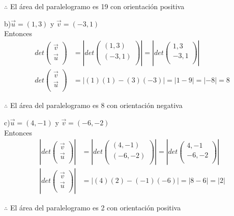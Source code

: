 \documentclass[letterpaper]{article}
\renewcommand{\*}{\cdot}
\theoremstyle{definition}
\begin{document}
	\begin{center}
		$ \therefore $ El área del paralelogramo es 19 con orientación positiva
	\end{center}
	b)$\vec{u}  = (1,3)$ y $\vec{v}  = (-3,1)$\\
	Entonces 
	\begin{align*}
		 det\begin{pmatrix}
		 \vec{v}\\
		 \vec{u}\\
		 \end{pmatrix}  & = \left|  det\begin{pmatrix}
		 (1,3)\\
		 (-3,1)\\
		 \end{pmatrix} \right| = \left|  det\begin{pmatrix}
		 1,3\\
		 -3,1\\
		 \end{pmatrix} \right|\\
		 det\begin{pmatrix}
		 \vec{v}\\
		 \vec{u}\\
		 \end{pmatrix} & = |(1)(1)-(3)(-3)| = |1-9| = |-8| = 8
	\end{align*}
	\begin{center}
		$ \therefore $ El área del paralelogramo es 8 con orientación negativa
	\end{center}
	c)$\vec{u}  = (4,-1)$ y $\vec{v}  = (-6,-2)$\\
	Entonces
	\begin{align*}
		\left| det\begin{pmatrix}
		\vec{v}\\
		\vec{u}\\
		\end{pmatrix} \right| & = \left| det\begin{pmatrix}
		(4,-1)\\
		(-6,-2)\\
		\end{pmatrix} \right| = \left| det\begin{pmatrix}
		4,-1\\
		-6,-2\\
		\end{pmatrix} \right|\\
		\left| det\begin{pmatrix}
		\vec{v}\\
		\vec{u}\\
		\end{pmatrix} \right| & = |(4)(2)-(-1)(-6)| = |8-6| = |2|
	\end{align*}
	\begin{center}
		$ \therefore $ El área del paralelogramo es 2 con orientación positiva
	\end{center}
\end{document}
